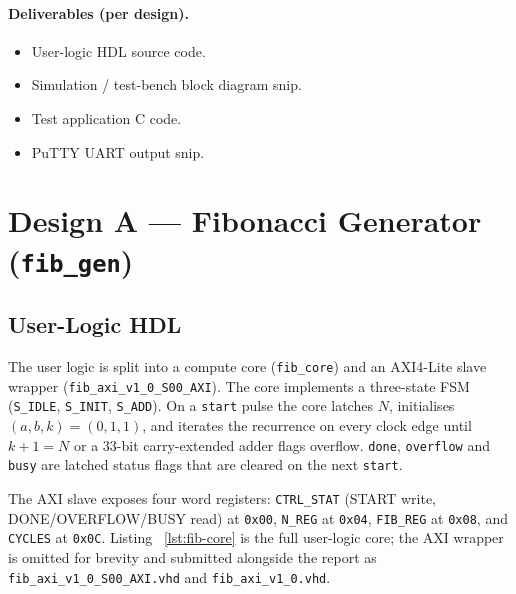 \documentclass[12pt]{article}
\begin{document}
\paragraph{Deliverables (per design).}
\begin{itemize}[nosep]
  \item User-logic HDL source code.
  \item Simulation / test-bench block diagram snip.
  \item Test application C code.
  \item PuTTY UART output snip.
\end{itemize}

\section{Design A --- Fibonacci Generator (\texttt{fib\_gen})}
\label{sec:fib}

\subsection{User-Logic HDL}
\label{sec:fib-hdl}

The user logic is split into a compute core (\texttt{fib\_core}) and an
AXI4-Lite slave wrapper (\texttt{fib\_axi\_v1\_0\_S00\_AXI}). The
core implements a three-state FSM (\texttt{S\_IDLE}, \texttt{S\_INIT},
\texttt{S\_ADD}). On a \texttt{start} pulse the core latches $N$,
initialises $(a,b,k){=}(0,1,1)$, and iterates the recurrence on every
clock edge until $k{+}1 = N$ or a 33-bit carry-extended adder flags
overflow. \texttt{done}, \texttt{overflow} and \texttt{busy} are
latched status flags that are cleared on the next \texttt{start}.

The AXI slave exposes four word registers:
\texttt{CTRL\_STAT} (START write, DONE/OVERFLOW/BUSY read) at
\texttt{0x00}, \texttt{N\_REG} at \texttt{0x04}, \texttt{FIB\_REG}
at \texttt{0x08}, and \texttt{CYCLES} at \texttt{0x0C}. Listing~%
\ref{lst:fib-core} is the full user-logic core; the AXI wrapper is
omitted for brevity and submitted alongside the report as
\texttt{fib\_axi\_v1\_0\_S00\_AXI.vhd} and \texttt{fib\_axi\_v1\_0.vhd}.


\end{document}
